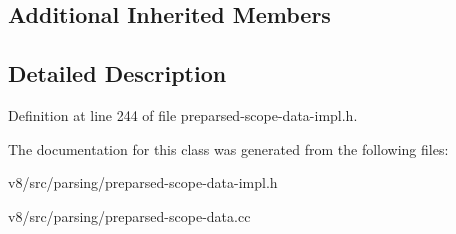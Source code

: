 \subsection*{Additional Inherited Members}


\subsection{Detailed Description}


Definition at line 244 of file preparsed-\/scope-\/data-\/impl.\+h.



The documentation for this class was generated from the following files\+:\begin{DoxyCompactItemize}
\item 
v8/src/parsing/preparsed-\/scope-\/data-\/impl.\+h\item 
v8/src/parsing/preparsed-\/scope-\/data.\+cc\end{DoxyCompactItemize}
